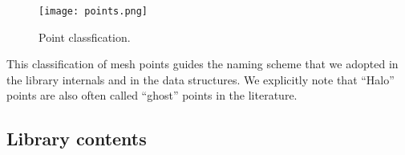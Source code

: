 \begin{figure}[h] 
\begin{center}
\ifcase\pdfoutput
\texttt{[image: points.png]}%
\or
{}
\fi
\end{center}
\caption{Point classfication.\label{fig:points}}
\end{figure}

This classification of mesh points guides the naming scheme that we
adopted in the library internals and in the data structures. We
explicitly note that ``Halo'' points are also often called ``ghost''
points in the literature. 



\subsection{Library contents}

